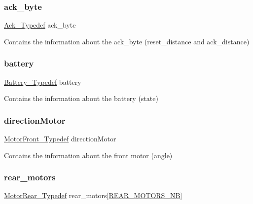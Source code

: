 \subsubsection{\texorpdfstring{ack\+\_\+byte}{ack\_byte}}
{\footnotesize\ttfamily \hyperlink{struct_ack___typedef}{Ack\+\_\+\+Typedef} ack\+\_\+byte}

Contains the information about the ack\+\_\+byte (reset\+\_\+distance and ack\+\_\+distance) \mbox{\label{struct_communication___typedef_ae3d4b0bc189b56df3a0e34afd8fe98b2}} 
\subsubsection{\texorpdfstring{battery}{battery}}
{\footnotesize\ttfamily \hyperlink{struct_battery___typedef}{Battery\+\_\+\+Typedef} battery}

Contains the information about the battery (state) \mbox{\label{struct_communication___typedef_a3a8290e3b46dab6047435b592b81efdc}} 
\subsubsection{\texorpdfstring{direction\+Motor}{directionMotor}}
{\footnotesize\ttfamily \hyperlink{struct_motor_front___typedef}{Motor\+Front\+\_\+\+Typedef} direction\+Motor}

Contains the information about the front motor (angle) \mbox{\label{struct_communication___typedef_a718b0adfdc43ccf0d67399e1583ac599}} 
\subsubsection{\texorpdfstring{rear\+\_\+motors}{rear\_motors}}
{\footnotesize\ttfamily \hyperlink{struct_motor_rear___typedef}{Motor\+Rear\+\_\+\+Typedef} rear\+\_\+motors\mbox{[}\hyperlink{motor__common_8h_adca07b02a9d917897a9809b7b19a2f79}{R\+E\+A\+R\+\_\+\+M\+O\+T\+O\+R\+S\+\_\+\+NB}\mbox{]}}


